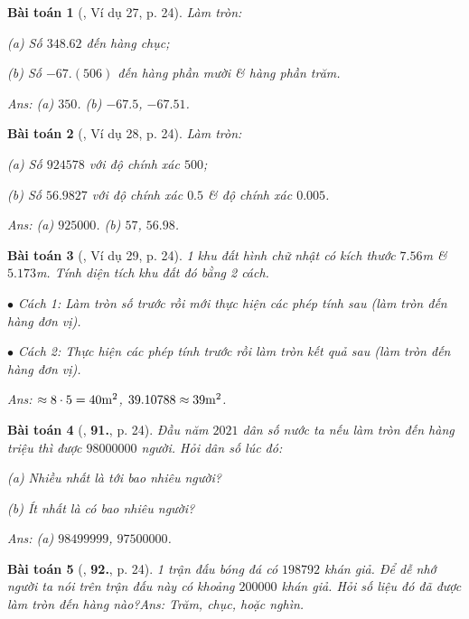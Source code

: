 \documentclass{article}
\numberwithin{equation}{section}
\newtheorem{baitoan}{Bài toán}
\begin{document}
\begin{baitoan}[\cite{Tuyen_Toan_7}, Ví dụ 27, p. 24]
	Làm tròn:
	\begin{enumerate*}
		\item[(a)] Số $348.62$ đến hàng chục;
		\item[(b)] Số $-67.(506)$ đến hàng phần mười \& hàng phần trăm.
	\end{enumerate*}\hfill{\sf Ans:} (a) $350$. (b) $-67.5$, $-67.51$.
\end{baitoan}

\begin{baitoan}[\cite{Tuyen_Toan_7}, Ví dụ 28, p. 24]
	Làm tròn:
	\begin{enumerate*}
		\item[(a)] Số $924578$ với độ chính xác $500$;
		\item[(b)] Số $56.9827$ với độ chính xác $0.5$ \& độ chính xác $0.005$.
	\end{enumerate*}\hfill{\sf Ans:} (a) $925000$. (b) $57$, $56.98$.
\end{baitoan}

\begin{baitoan}[\cite{Tuyen_Toan_7}, Ví dụ 29, p. 24]
	1 khu đất hình chữ nhật có kích thước $7.56$\emph{m} \& $5.173$\emph{m}. Tính diện tích khu đất đó bằng 2 cách.
	\begin{enumerate*}
		\item[$\bullet$] Cách 1: Làm tròn số trước rồi mới thực hiện các phép tính sau (làm tròn đến hàng đơn vị).
		\item[$\bullet$] Cách 2: Thực hiện các phép tính trước rồi làm tròn kết quả sau (làm tròn đến hàng đơn vị).
	\end{enumerate*}\hfill{\sf Ans:} $\approx\rm 8\cdot 5 = 40m^2$, $\rm39.10788\approx 39m^2$.
\end{baitoan}

\begin{baitoan}[\cite{Tuyen_Toan_7}, \textbf{91.}, p. 24]
	Đầu năm $2021$ dân số nước ta nếu làm tròn đến hàng triệu thì được $98000000$ người. Hỏi dân số lúc đó:
	\begin{enumerate*}
		\item[(a)] Nhiều nhất là tới bao nhiêu người?
		\item[(b)] Ít nhất là có bao nhiêu người? 
	\end{enumerate*}\hfill{\sf Ans:} (a) $98499999$, $97500000$.
\end{baitoan}

\begin{baitoan}[\cite{Tuyen_Toan_7}, \textbf{92.}, p. 24]
	1 trận đấu bóng đá có $198 792$ khán giả. Để dễ nhớ người ta nói trên trận đấu này có khoảng $200000$ khán giả. Hỏi số liệu đó đã được làm tròn đến hàng nào?\hfill{\sf Ans:} Trăm, chục, hoặc nghìn.
\end{baitoan}
\end{document}
